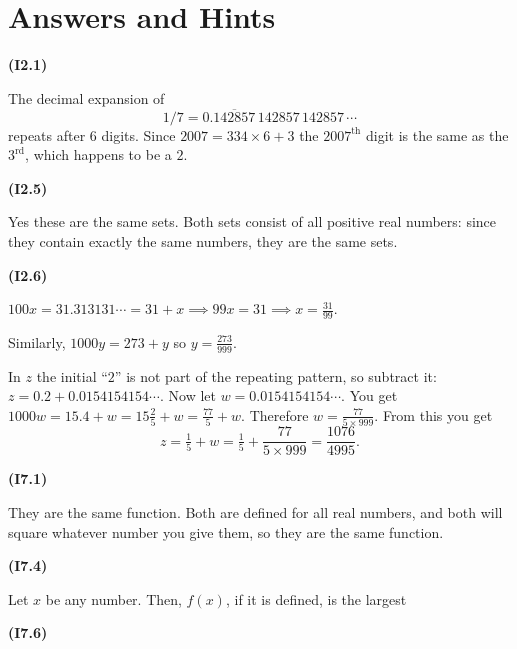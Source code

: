 \documentclass[openany,reqno]{amsbook}
\begin{document}
\graphicspath{{figures/}}
\section*{Answers and Hints}
\begin{trivlist}\problemfont
  \setlength{\parindent}{0pt}
  \setlength{\parskip}{0.5ex plus0.5ex}
  \raggedright
  \relax



\item[{\bf(I2.1)}]

  The decimal expansion of
  \[
    1/7 = 0.\overline{142857}\,142857\,142857\,\cdots
  \]
  repeats after 6 digits.  Since $2007 =
  334\times6+3$ the $2007^{\textrm{th}}$ digit is the same as the
  $3^{\textrm{rd}}$, which happens to be a $2$.
  \bigskip

\item[{\bf(I2.5)}]

  Yes these are the same sets.  Both sets consist of all positive real
  numbers: since they contain exactly the same numbers, they are the
  same sets.
  \bigskip

\item[{\bf(I2.6)}]

  $100x = 31.313131\cdots = 31+x \implies 99x = 31 \implies x =
  \frac{31}{99}$.

  Similarly, $1000y = 273 + y$ so $y= \frac{273}{999}$.

  In $z$ the initial ``$2$'' is not part of the repeating pattern, so
  subtract it:  $z = 0.2 + 0.0154154154\cdots$.  Now let
  $w=0.0154154154\cdots$.  You get $1000w = 15.4+w = 15\frac25 + w =
  \frac{77}{5}+w$. Therefore $w= \frac{77}{5\times 999}$.
  From this you get
  \[
    z = \tfrac15+w = \tfrac15 +  \frac{77}{5\times999} = \frac{1076}{4995}.
  \]
  \bigskip

\item[{\bf(I7.1)}]

  They are the same function.  Both are defined for all real numbers,
  and both will square whatever number you give them, so they are the
  same function.
  \bigskip

\item[{\bf(I7.4)}]

  Let $x$ be any number.  Then, $f(x)$, if it is defined, is the largest

  \bigskip

\item[{\bf(I7.6)}]


\end{trivlist}
\end{document}
